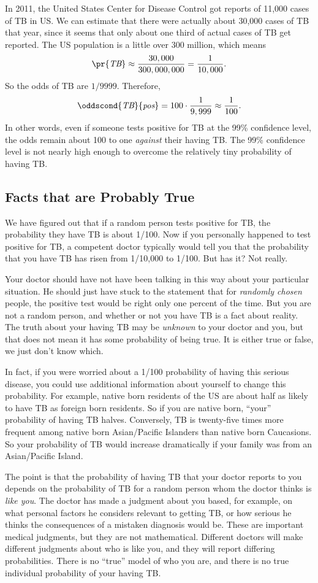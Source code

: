 In 2011, the United States Center for Disease Control got reports of
11,000 cases of TB in US.  We can estimate that there were actually
about 30,000 cases of TB that year, since it seems that only about one
third of actual cases of TB get reported.  The US population is a
little over 300 million, which means
\[
\pr{\TB} \approx \frac{30,000}{300,000,000} = \frac{1}{10,000}.
\]
So the odds of TB are $1/9999$.  Therefore,
\[
\oddscond{\TB}{\testplus} = 100 \cdot \frac{1}{9,999} \approx \frac{1}{100}.
\]
In other words, even if someone tests positive for TB at the 99\%
confidence level, the odds remain about 100 to one \emph{against}
their having TB.  The 99\% confidence level is not nearly high enough
to overcome the relatively tiny probability of having TB.

\subsection{Facts that are Probably True}
We have figured out that if a random person tests positive for TB, the
probability they have TB is about 1/100.  Now if you personally
happened to test positive for TB, a competent doctor typically would
tell you that the probability that you have TB has risen from 1/10,000
to 1/100.  But has it?  Not really.

Your doctor should have not have been talking in this way about your
particular situation.  He should just have stuck to the statement that
for \emph{randomly chosen} people, the positive test would be right
only one percent of the time.  But you are not a random person, and
whether or not you have TB is a fact about reality.  The truth about
your having TB may be \emph{unknown} to your doctor and you, but that
does not mean it has some probability of being true.  It is either
true or false, we just don't know which.

In fact, if you were worried about a 1/100 probability of having this
serious disease, you could use additional information about yourself
to change this probability.  For example, native born residents of the
US are about half as likely to have TB as foreign born residents.  So
if you are native born, ``your'' probability of having TB halves.
Conversely, TB is twenty-five times more frequent among native born
Asian/Pacific Islanders than native born Caucasions.  So your
probability of TB would increase dramatically if your family was from
an Asian/Pacific Island.

The point is that the probability of having TB that your doctor
reports to you depends on the probability of TB for a random person
whom the doctor thinks is \emph{like you}.  The doctor has made a
judgment about you based, for example, on what personal factors he
considers relevant to getting TB, or how serious he thinks the
consequences of a mistaken diagnosis would be.  These are important
medical judgments, but they are not mathematical.  Different doctors
will make different judgments about who is like you, and they will
report differing probabilities.  There is no ``true'' model of who you
are, and there is no true individual probability of your having TB.

